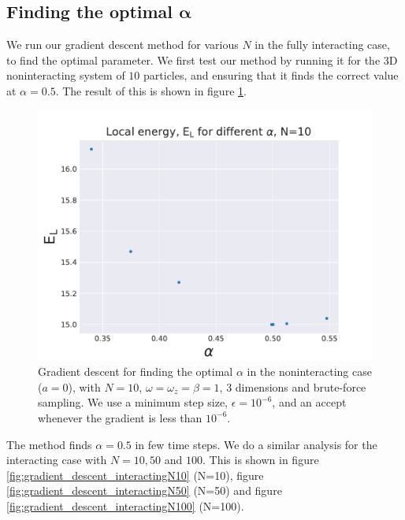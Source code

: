 \documentclass[a4paper, 10pt]{article}
\begin{document}
	\subsection{Finding the optimal $\boldsymbol{\alpha}$}
	We run our gradient descent method for various $N$ in the fully interacting case, to find the optimal parameter. We first test our method by running it for the 3D noninteracting system of $10$ particles, and ensuring that it finds the correct value at $\alpha=0.5$. The result of this is shown in figure \ref{fig:gradient_descent_noninteracting}.
			\begin{figure}[ht!]
				\centering
				\includegraphics[scale=0.8]{../Results/E_v_alpha_gradient_noninteracting.pdf}
				\caption{Gradient descent for finding the optimal $\alpha$ in the noninteracting case ($a=0$), with $N=10$, $\omega=\omega_z=\beta=1$, 3 dimensions and brute-force sampling. We use a minimum step size, $\epsilon=10^{-6}$, and an accept whenever the gradient is less than $10^{-6}$.}\label{fig:gradient_descent_noninteracting}
			\end{figure}
	The method finds $\alpha=0.5$ in few time steps. We do a similar analysis for the interacting case with $N=10,50$ and $100$. This is shown in figure \ref{fig:gradient_descent_interactingN10} (N=10), figure \ref{fig:gradient_descent_interactingN50} (N=50) and figure \ref{fig:gradient_descent_interactingN100} (N=100).
\end{document}
